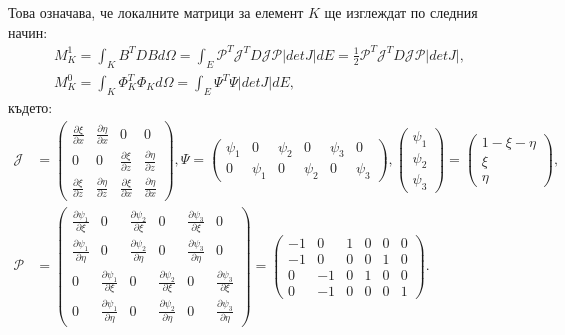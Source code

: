 \documentclass{report}
\begin{document}
	Това означава, че локалните матрици за елемент $K$ ще изглеждат по следния начин:
	\begin{align*}
		M^1_K =\int_K B^TDB d\Omega = \int_E \mathcal{P}^T \mathcal{J}^T D \mathcal{J}	\mathcal{P} |detJ|dE=
		\frac{1}{2}\mathcal{P}^T \mathcal{J}^T D \mathcal{J}	\mathcal{P} |detJ|,\\
		M^0_K = \int_K \Phi_K^T\Phi_K d\Omega = \int_E \Psi^T\Psi|detJ| dE,
	\end{align*}
	където:
	\begin{align*}
		\mathcal{J} &= \begin{pmatrix}
			\frac{\partial \xi}{\partial x} & \frac{\partial \eta}{\partial x} & 0 & 0\\
			0 & 0 & 	\frac{\partial \xi}{\partial z} & \frac{\partial \eta}{\partial z}\\
			\frac{\partial \xi}{\partial z} & \frac{\partial \eta}{\partial z} & \frac{\partial \xi}{\partial x} & \frac{\partial \eta}{\partial x}
		\end{pmatrix},
		\Psi = \begin{pmatrix}
			\psi_1 & 0 & \psi_2 & 0 & \psi_3 & 0\\
			0 & \psi_1 & 0 & \psi_2 & 0 & \psi_3
		\end{pmatrix}, 
		\begin{pmatrix}
			\psi_1 \\ \psi_2 \\ \psi_3
		\end{pmatrix} = 
		\begin{pmatrix}
			1- \xi - \eta\\ \xi \\ \eta
		\end{pmatrix},\\
		\mathcal{P} &= 
		\begin{pmatrix}
			\frac{\partial \psi_1}{\partial \xi} & 0 &\frac{\partial \psi_2}{\partial \xi} & 0 & \frac{\partial \psi_3}{\partial \xi} & 0\\
			\frac{\partial \psi_1}{\partial \eta} & 0 &\frac{\partial \psi_2}{\partial \eta} & 0 & \frac{\partial \psi_3}{\partial \eta} & 0\\
			0 & \frac{\partial \psi_1}{\partial \xi} & 0 &\frac{\partial \psi_2}{\partial \xi} & 0 &\frac{\partial \psi_3}{\partial \xi}\\
			0 & \frac{\partial \psi_1}{\partial \eta} & 0 &\frac{\partial \psi_2}{\partial \eta} & 0 &\frac{\partial \psi_3}{\partial \eta}
		\end{pmatrix} = 
		\begin{pmatrix}
			-1 & 0 & 1 & 0 & 0 & 0\\
			-1 & 0 & 0 & 0 & 1 & 0\\
			0 & -1 & 0 & 1 & 0 & 0\\
			0 & -1 & 0 & 0 & 0 & 1
		\end{pmatrix}.
	\end{align*}
	
\end{document}
